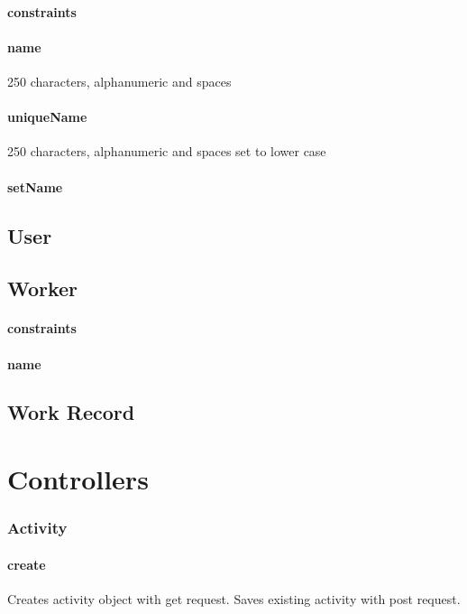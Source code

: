 \documentclass[12pt]{article}
\begin{document}
\paragraph{constraints}
\paragraph{name} 250 characters, alphanumeric and spaces 
\paragraph{uniqueName} 250 characters, alphanumeric and spaces  set to lower case
\paragraph{setName}

\setcounter{paragraph}{0}
\subsection{User}\label{sec:DUser}
\subsection{Worker}\label{sec:DWorker}
\paragraph{constraints}
\paragraph{name}

\setcounter{paragraph}{0}
\subsection{Work Record}\label{sec:DWork Record}

\section{Controllers}\label{sec:Controllers}

\subsubsection{Activity}\label{sec:CActivity}
\paragraph{create} Creates activity object with get request. Saves existing activity with post request.
\end{document}
